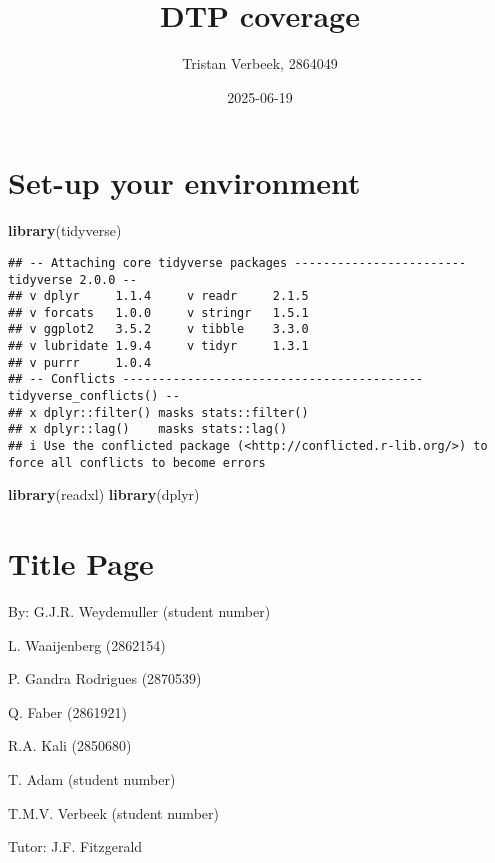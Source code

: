 \documentclass[
]{article}
\title{DTP coverage}
\author{Tristan Verbeek, 2864049}
\date{2025-06-19}
\newenvironment{Shaded}{\begin{snugshade}}{\end{snugshade}}
\newcommand{\FunctionTok}[1]{\textcolor[rgb]{0.13,0.29,0.53}{\textbf{#1}}}
\newcommand{\NormalTok}[1]{#1}
\begin{document}
\maketitle

\section{Set-up your environment}\label{set-up-your-environment}

\begin{Shaded}
\begin{Highlighting}[]
\FunctionTok{library}\NormalTok{(tidyverse)}
\end{Highlighting}
\end{Shaded}

\begin{verbatim}
## -- Attaching core tidyverse packages ------------------------ tidyverse 2.0.0 --
## v dplyr     1.1.4     v readr     2.1.5
## v forcats   1.0.0     v stringr   1.5.1
## v ggplot2   3.5.2     v tibble    3.3.0
## v lubridate 1.9.4     v tidyr     1.3.1
## v purrr     1.0.4     
## -- Conflicts ------------------------------------------ tidyverse_conflicts() --
## x dplyr::filter() masks stats::filter()
## x dplyr::lag()    masks stats::lag()
## i Use the conflicted package (<http://conflicted.r-lib.org/>) to force all conflicts to become errors
\end{verbatim}

\begin{Shaded}
\begin{Highlighting}[]
\FunctionTok{library}\NormalTok{(readxl)}
\FunctionTok{library}\NormalTok{(dplyr)}
\end{Highlighting}
\end{Shaded}

\section{Title Page}\label{title-page}

By: G.J.R. Weydemuller (student number)

L. Waaijenberg (2862154)

P. Gandra Rodrigues (2870539)

Q. Faber (2861921)

R.A. Kali (2850680)

T. Adam (student number)

T.M.V. Verbeek (student number)

Tutor: J.F. Fitzgerald
\end{document}
